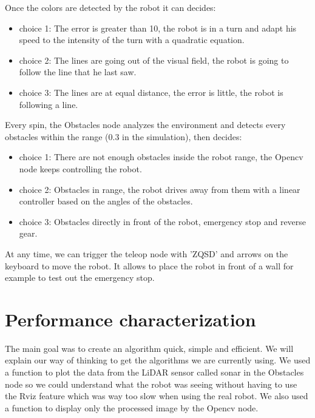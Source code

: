 \documentclass[conference]{IEEEtran}
\begin{document}
Once the colors are detected by the robot it can decides:
\begin{itemize}
    \item choice 1: The error is greater than 10, the robot is in a turn and adapt his speed to the intensity of the turn with a quadratic equation.
    \item choice 2: The lines are going out of the visual field, the robot is going to follow the line that he last saw.
    \item choice 3: The lines are at equal distance, the error is little, the robot is following a line.
\end{itemize}
Every spin, the Obstacles node analyzes the environment and detects every obstacles within the range (0.3 in the simulation), then decides:
\begin{itemize}
    \item choice 1: There are not enough obstacles inside the robot range, the Opencv node keeps controlling the robot.
    \item choice 2: Obstacles in range, the robot drives away from them with a linear controller based on the angles of the obstacles.
    \item choice 3: Obstacles directly in front of the robot, emergency stop and reverse gear.
\end{itemize}
At any time, we can trigger the teleop node with 'ZQSD' and arrows on the keyboard to move the robot. It allows to place the robot in front of a wall for example to test out the emergency stop.

%

\section{Performance characterization}
The main goal was to create an algorithm quick, simple and efficient. We will explain our way of thinking to get the algorithms we are currently using.
We used a function to plot the data from the LiDAR sensor called sonar in the Obstacles node so we could understand what the robot was seeing without having to use the Rviz feature which was way too slow when using the real robot. We also used a function to display only the processed image by the Opencv node.
\end{document}
